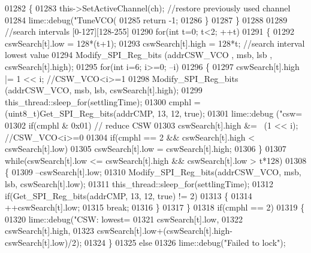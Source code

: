 \begin{DoxyCode}
{{{{{{{{{{{{{{{{{{{{{{{{{{{{{{{{{{{{{01282         \{
01283             this->SetActiveChannel(ch); \textcolor{comment}{//restore previously used channel}
01284             lime::debug(\textcolor{stringliteral}{"TuneVCO(%
01285             \textcolor{keywordflow}{return} -1;
01286         \}
01287     \}
01288 
01289     \textcolor{comment}{//search intervals [0-127][128-255]}
01290     \textcolor{keywordflow}{for}(\textcolor{keywordtype}{int} t=0; t<2; ++t)
01291         \{
01292         cswSearch[t].low = 128*(t+1);
01293         cswSearch[t].high = 128*t; \textcolor{comment}{//search interval lowest value}
01294         Modify_SPI_Reg_bits (addrCSW\_VCO , msb, lsb , cswSearch[t].high);
01295         \textcolor{keywordflow}{for}(\textcolor{keywordtype}{int} i=6; i>=0; --i)
01296         \{
01297             cswSearch[t].high |= 1 << i; \textcolor{comment}{//CSW\_VCO<i>=1}
01298             Modify_SPI_Reg_bits (addrCSW\_VCO, msb, lsb, cswSearch[t].high);
01299             this\_thread::sleep\_for(settlingTime);
01300             cmphl = (uint8\_t)Get_SPI_Reg_bits(addrCMP, 13, 12, \textcolor{keyword}{true});
01301             lime::debug (\textcolor{stringliteral}{"csw=%
01302             \textcolor{keywordflow}{if}(cmphl & 0x01) \textcolor{comment}{// reduce CSW}
01303                 cswSearch[t].high &= ~(1 << i); \textcolor{comment}{//CSW\_VCO<i>=0}
01304             \textcolor{keywordflow}{if}(cmphl == 2 && cswSearch[t].high < cswSearch[t].low)
01305                 cswSearch[t].low = cswSearch[t].high;
01306         \}
01307         \textcolor{keywordflow}{while}(cswSearch[t].low <= cswSearch[t].high && cswSearch[t].low > t*128)
01308         \{
01309             --cswSearch[t].low;
01310             Modify_SPI_Reg_bits(addrCSW\_VCO, msb, lsb, cswSearch[t].low);
01311             this\_thread::sleep\_for(settlingTime);
01312             \textcolor{keywordflow}{if}(Get_SPI_Reg_bits(addrCMP, 13, 12, \textcolor{keyword}{true}) != 2)
01313             \{
01314                 ++cswSearch[t].low;
01315             \textcolor{keywordflow}{break};
01316         \}
01317     \}
01318         \textcolor{keywordflow}{if}(cmphl == 2)
01319     \{
01320             lime::debug(\textcolor{stringliteral}{"CSW: lowest=%
01321                         cswSearch[t].low,
01322                         cswSearch[t].high,
01323                         cswSearch[t].low+(cswSearch[t].high-cswSearch[t].low)/2);
01324         \}
01325         \textcolor{keywordflow}{else}
01326             lime::debug(\textcolor{stringliteral}{"Failed to lock"});
}}}}}}}}}}}}}}}}}}}}}}}}}}}}}}}}}}}}}}}}
\end{DoxyCode}

